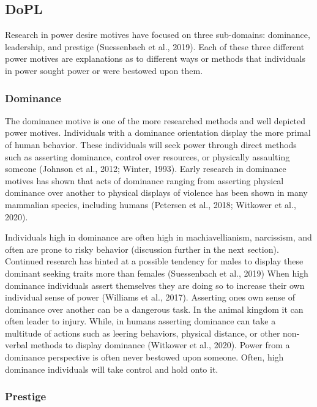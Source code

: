 \documentclass[
  english,
  a4paper,floatsintext]{apa7}
\begin{document}
\hypertarget{dopl}{%
\subsection{DoPL}\label{dopl}}

Research in power desire motives have focused on three sub-domains: dominance, leadership, and prestige (Suessenbach et al., 2019). Each of these three different power motives are explanations as to different ways or methods that individuals in power sought power or were bestowed upon them.

\hypertarget{dominance}{%
\subsubsection{Dominance}\label{dominance}}

The dominance motive is one of the more researched methods and well depicted power motives. Individuals with a dominance orientation display the more primal of human behavior. These individuals will seek power through direct methods such as asserting dominance, control over resources, or physically assaulting someone (Johnson et al., 2012; Winter, 1993). Early research in dominance motives has shown that acts of dominance ranging from asserting physical dominance over another to physical displays of violence has been shown in many mammalian species, including humans (Petersen et al., 2018; Witkower et al., 2020).

Individuals high in dominance are often high in machiavellianism, narcissism, and often are prone to risky behavior (discussion further in the next section). Continued research has hinted at a possible tendency for males to display these dominant seeking traits more than females (Suessenbach et al., 2019) When high dominance individuals assert themselves they are doing so to increase their own individual sense of power (Williams et al., 2017). Asserting ones own sense of dominance over another can be a dangerous task. In the animal kingdom it can often leader to injury. While, in humans asserting dominance can take a multitude of actions such as leering behaviors, physical distance, or other non-verbal methods to display dominance (Witkower et al., 2020). Power from a dominance perspective is often never bestowed upon someone. Often, high dominance individuals will take control and hold onto it.

\hypertarget{prestige}{%
\subsubsection{Prestige}\label{prestige}}
\end{document}
